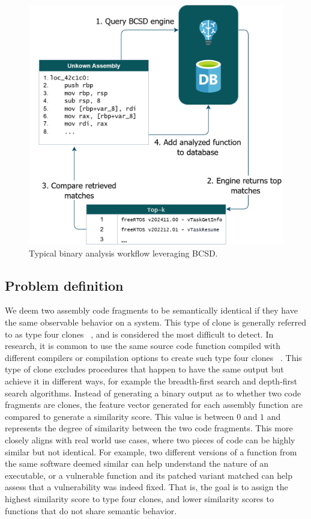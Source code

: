 \begin{figure}[t]
\centerline{\includegraphics[width=\linewidth]{BCSD-schematic}}
\caption{Typical binary analysis workflow leveraging BCSD.}
\label{BCSD-workflow}
\end{figure}

\subsection{Problem definition}

We deem two assembly code fragments to be semantically identical if they have the same observable behavior on a system.
This type of clone is generally referred to as type four clones ~\cite{Asm2Vec,BinClone}, and is considered the most difficult
to detect. In research, it is common to use the same source code function compiled with different compilers or compilation
options to create such type four clones ~\cite{SAFE,PalmTree,OrderMatters,Asm2Vec,CLAP}.  This type of clone excludes
procedures that happen to have the same output but achieve it in different ways, for example the breadth-first search and
depth-first search algorithms. Instead of generating a binary output as to whether two code fragments are clones, the feature
vector generated for each assembly function are compared to generate a similarity score. This value is between \(0\) and \(1\) and
represents the degree of similarity between the two code fragments. This more closely aligns with real world use cases, where
two pieces of code can be highly similar but not identical. For example, two different versions of a function from the same
software deemed similar can help understand the nature of an executable, or a vulnerable function and its patched variant matched
can help assess that a vulnerability was indeed fixed. That is, the goal is to assign the highest similarity score to type four
clones, and lower similarity scores to functions that do not share semantic behavior. 

